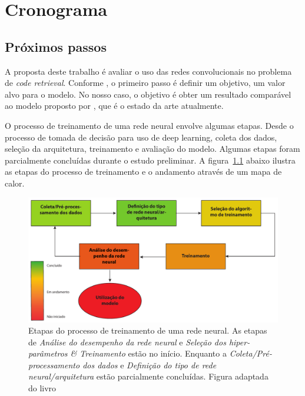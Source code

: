 \chapter{Cronograma}
\label{cap:cronograma}

\section{Próximos passos}

A proposta deste trabalho é avaliar o uso das redes convolucionais no problema de \textit{code retrieval}. Conforme \cite{Goodfellow-et-al-2016:pratical-methodology}, o primeiro passo é definir um objetivo, um valor alvo para o modelo. No nosso caso, o objetivo é obter um resultado comparável ao modelo proposto por \cite{cambronero-deep-learning-code-search:2019}, que é o estado da arte atualmente.

O processo de treinamento de uma rede neural envolve algumas etapas. Desde o processo de tomada de decisão para uso de deep learning, coleta dos dados, seleção da arquitetura, treinamento e avaliação do modelo. Algumas etapas foram parcialmente concluídas durante o estudo preliminar. A figura~\ref{fig:neural-network-process-training} abaixo ilustra as etapas do processo de treinamento e o andamento através de um mapa de calor.


\begin{figure}[h]
    \centering
    \includegraphics[width=1\textwidth]{figuras/cap-cronograma/training_process.pdf}
    \caption{Etapas do processo de treinamento de uma rede neural. As etapas de \emph{Análise do desempenho da rede neural} e \emph{Seleção dos hiper-parâmetros \& Treinamento} estão no início. Enquanto a \emph{Coleta/Pré-processamento dos dados} e \emph{Definição do tipo de rede neural/arquitetura} estão parcialmente concluídas. Figura adaptada do livro \cite{nndesign:2014:pratical-training-issues}}
    \label{fig:neural-network-process-training}
\end{figure}

